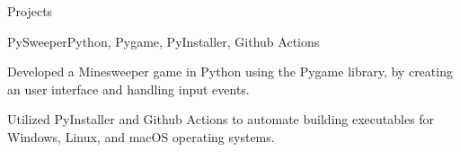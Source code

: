 \documentclass[]{rh-resume}
\begin{document}
\begin{section}{Projects}
\begin{subsectionproject}{PySweeper}{Python, Pygame, PyInstaller, Github Actions}{}
    \item{Developed a Minesweeper game in Python using the Pygame library, by creating an user interface and handling input events.}
    \item{Utilized PyInstaller and Github Actions to automate building executables for Windows, Linux, and macOS operating systems.}
\end{subsectionproject}

\end{section}
\end{document}
